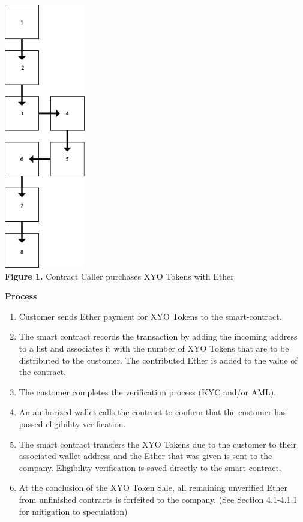 \documentclass{article}
\begin{document}
\begin{multicols}{2}
\begin{center}
\includegraphics[width=100pt] {archXYOTokenSale.png}\\
\vspace{4mm}
\vfill
\textbf{Figure 1.}  Contract Caller purchases XYO Tokens with Ether
\end{center}

\columnbreak

\begin{center}
\textbf{Process}
\end{center}
\begin{enumerate}
\item Customer sends Ether payment for XYO Tokens to the \gls{smart-contract}.
\item The smart contract records the \gls{transaction} by adding the incoming address to a list and associates it with the number of XYO Tokens that are to be distributed to the customer.  The contributed Ether is added to the value of the contract.
\item The customer completes the verification process (KYC and/or AML).
\item An authorized wallet calls the contract to confirm that the customer has passed eligibility verification.
\item The smart contract transfers the XYO Tokens due to the customer to their associated wallet address and the Ether that was given is sent to the company. Eligibility verification is saved directly to the smart contract.
\item At the conclusion of the XYO Token Sale, all remaining unverified Ether from unfinished contracts is forfeited to the company. (See Section 4.1-4.1.1 for mitigation to speculation)
\end{enumerate}

\end{multicols}
\end{document}
